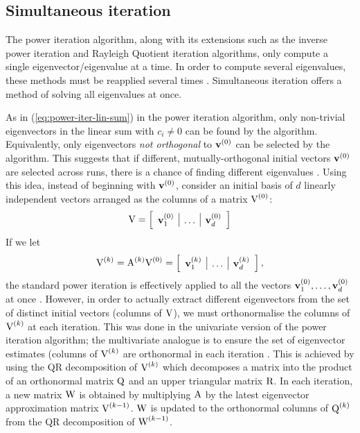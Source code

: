 \subsection{Simultaneous iteration}
The power iteration algorithm, along with its extensions such as the inverse power iteration and Rayleigh Quotient iteration algorithms, only compute a single eigenvector/eigenvalue at a time. In order to compute several eigenvalues, these methods must be reapplied several times \cite{panju-iterative-eig}. Simultaneous iteration offers a method of solving all eigenvalues at once. 

As in (\ref{eq:power-iter-lin-sum}) in the power iteration algorithm, only non-trivial eigenvectors in the linear sum with $c_i \neq 0$ can be found by the algorithm. Equivalently, only eigenvectors \textit{not orthogonal} to ${\mathbf{v}}^{(0)}$ can be selected by the algorithm. This suggests that if different, mutually-orthogonal initial vectors ${\mathbf{v}}^{(0)}$ are selected across runs, there is a chance of finding different eigenvalues \cite{panju-iterative-eig}. Using this idea, instead of beginning with ${\mathbf{v}}^{(0)}$, consider an initial basis of $d$ linearly independent vectors arranged as the columns of a matrix ${\textrm{V}}^{(0)}$:
\begin{equation}
    {\textrm{V}} = \left[\begin{array}{l|l|l}{\mathbf{v}}_1^{(0)} & \dots & {\mathbf{v}}_d^{(0)}\end{array}\right]
\end{equation}
If we let
\begin{equation}
       {\textrm{V}}^{(k)} = {\textrm{A}}^{(k)}{\textrm{V}}^{(0)} = \left[\begin{array}{l|l|l}{\mathbf{v}}_1^{(k)} & \dots & {\mathbf{v}}_d^{(k)}\end{array}\right],
\end{equation}
the standard power iteration is effectively applied to all the vectors ${\mathbf{v}}_1^{(0)}, \dots, {\mathbf{v}}_d^{(0)}$ at once \cite{panju-iterative-eig}. However, in order to actually extract different eigenvectors from the set of distinct initial vectors (columns of ${\textrm{V}}$), we must orthonormalise the columns of ${\textrm{V}}^{(k)}$ at each iteration. This was done in the univariate version of the power iteration algorithm; the multivariate analogue is to ensure the set of eigenvector estimates (columns of ${\textrm{V}}^{(k)}$ are orthonormal in each iteration \cite{panju-iterative-eig}. This is achieved by using the QR decomposition of ${\textrm{V}}^{(k)}$ which decomposes a matrix into the product of an orthonormal matrix ${\textrm{Q}}$ and an upper triangular matrix ${\textrm{R}}$. In each iteration, a new matrix ${\textrm{W}}$ is obtained by multiplying ${\textrm{A}}$ by the latest eigenvector approximation matrix ${\textrm{V}}^{(k-1)}$. ${\textrm{W}}$ is updated to the orthonormal columns of ${\textrm{Q}}^{(k)}$ from the QR decomposition of ${\textrm{W}}^{(k-1)}$.


